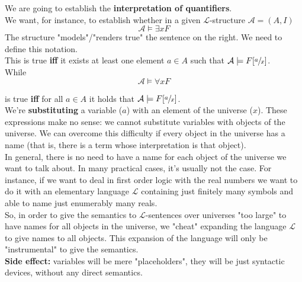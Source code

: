 We are going to establish the \textbf{interpretation of quantifiers}.\\

We want, for instance, to establish whether in a given $\mathcal{L}$-structure $\mathcal{A} = (A,I)$
$$ \mathcal{A} \models \exists x F$$
The structure "models"/"renders true" the sentence on the right. We need to define this notation.\\

This is true \textbf{iff} it exists at least one element $a \in A$ such that $\mathcal{A} \models F[\sfrac{a}{x}]$.\\
While
$$ \mathcal{A} \models \forall x F $$

is true \textbf{iff} for all $a \in A$ it holds that $\mathcal{A} \models F[\sfrac{a}{x}]$.\\

We're \textbf{substituting} a variable ($a$) with an element of the universe ($x$). These expressions make no sense: we cannot substitute variables with objects of the universe. We can overcome this difficulty if every object in the universe has a name (that is, there is a term whose interpretation is that object).\\

In general, there is no need to have a name for each object of the universe we want to talk about. In many practical cases, it's usually not the case. For instance, if we want to deal in first order logic with the real numbers we want to do it with an elementary language $\mathcal{L}$ containing just finitely many symbols and able to name just enumerably many reals.\\ 

So, in order to give the semantics to $\mathcal{L}$-sentences over universes "too large" to have names for all objects in the universe, we "cheat" expanding the language $\mathcal{L}$ to give names to all objects. This expansion of the language will only be "instrumental" to give the semantics.\\

\textbf{Side effect:} variables will be mere "placeholders", they will be just syntactic devices, without any direct semantics.\\

